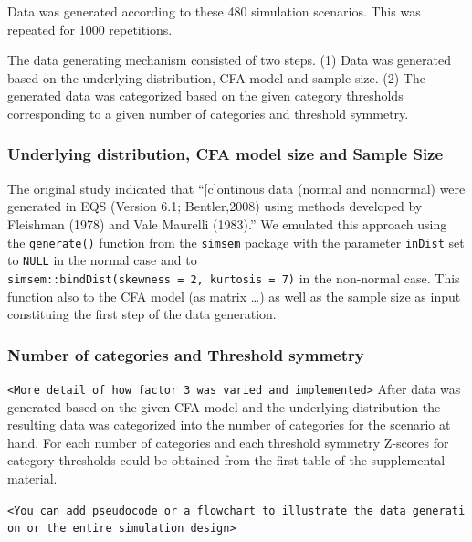 \documentclass[10,a4paperpaper,]{article}
\begin{document}
Data was generated according to these 480 simulation scenarios. This was
repeated for 1000 repetitions.

The data generating mechanism consisted of two steps. (1) Data was
generated based on the underlying distribution, CFA model and sample
size. (2) The generated data was categorized based on the given category
thresholds corresponding to a given number of categories and threshold
symmetry.

\subsubsection{Underlying distribution, CFA model size and Sample Size}

The original study indicated that ``{[}c{]}ontinous data (normal and
nonnormal) were generated in EQS (Version 6.1; Bentler,2008) using
methods developed by Fleishman (1978) and Vale Maurelli (1983).'' We
emulated this approach using the \texttt{generate()} function from the
\texttt{simsem} package with the parameter \texttt{inDist} set to
\texttt{NULL} in the normal case and to
\texttt{simsem::bindDist(skewness\ =\ 2,\ kurtosis\ =\ 7)} in the
non-normal case. This function also to the CFA model (as matrix \ldots)
as well as the sample size as input constituing the first step of the
data generation.

\subsubsection{Number of categories and Threshold symmetry}

\texttt{\textless{}More\ detail\ of\ how\ factor\ 3\ was\ varied\ and\ implemented\textgreater{}}
After data was generated based on the given CFA model and the underlying
distribution the resulting data was categorized into the number of
categories for the scenario at hand. For each number of categories and
each threshold symmetry Z-scores for category thresholds could be
obtained from the first table of the supplemental material.

\texttt{\textless{}You\ can\ add\ pseudocode\ or\ a\ flowchart\ to\ illustrate\ the\ data\ generation\ or\ the\ entire\ simulation\ design\textgreater{}}
\end{document}
